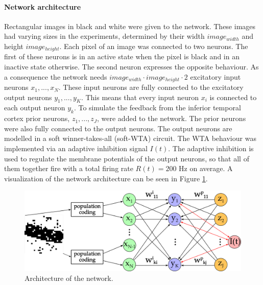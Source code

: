 \paragraph{Network architecture}
Rectangular images in black and white were given to the network. These images had varying sizes in the experiments, determined by their width $image_{width}$ and height $image_{height}$. Each pixel of an image was connected to two neurons. The first of these neurons is in an active state when the pixel is black and in an inactive state otherwise. The second neuron expresses the opposite behaviour. As a consequence the network needs $image_{width} \cdot image_{height} \cdot 2$ excitatory input neurons $x_1,...,x_N$. These input neurons are fully connected to the excitatory output neurons $y_1,...,y_K$. This means that every input neuron $x_i$ is connected to each output neuron $y_k$. 
To simulate the feedback from the inferior temporal cortex prior neurons, $z_1,...,z_J$, were added to the network. The prior neurons were also fully connected to the output neurons. The output neurons are modelled in a soft winner-takes-all (soft-WTA) circuit. The WTA behaviour was implemented via an adaptive inhibition signal $I(t)$. The adaptive inhibition is used to regulate the membrane potentials of the output neurons, so that all of them together fire with a total firing rate $R(t) = 200\text{ Hz}$ on average. A visualization of the network architecture can be seen in Figure \ref{fig:networkArchitecture}.

\begin{figure}
  \label{fig:networkArchitecture}
  \includegraphics[width=\linewidth]{figures/networkPlan.png}
  \caption{Architecture of the network.}
\end{figure}

